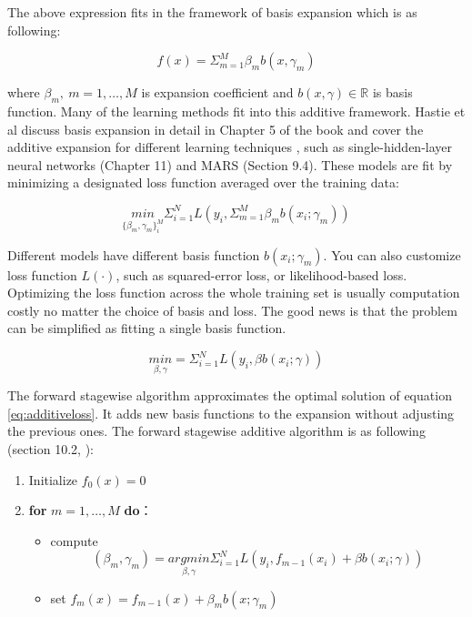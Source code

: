 \documentclass[12pt,]{krantz}
\providecommand{\tightlist}{%
  \setlength{\itemsep}{0pt}\setlength{\parskip}{0pt}}
\begin{document}
The above expression fits in the framework of basis expansion which is as following:

\begin{equation}
f(x)=\Sigma_{m=1}^M \beta_m b(x,\gamma_m)
\label{eq:basisexp}
\end{equation}

where \(\beta_m,\ m=1,\dots,M\) is expansion coefficient and \(b(x,\gamma)\in \mathbb{R}\) is basis function. Many of the learning methods fit into this additive framework. Hastie et al discuss basis expansion in detail in Chapter 5 of the book \citep{Hastie2008} and cover the additive expansion for different learning techniques \citep{Hastie2008}, such as single-hidden-layer neural networks (Chapter 11) and MARS (Section 9.4). These models are fit by minimizing a designated loss function averaged over the training data:

\begin{equation}
\underset{\{\beta_m,\gamma_m\}_i^M}{min}\Sigma_{i=1}^N L\left(y_i,\Sigma_{m=1}^M\beta_{m}b(x_i;\gamma_m)\right)
\label{eq:additiveloss}
\end{equation}

Different models have different basis function \(b(x_i;\gamma_m)\). You can also customize loss function \(L(\cdot)\), such as squared-error loss, or likelihood-based loss. Optimizing the loss function across the whole training set is usually computation costly no matter the choice of basis and loss. The good news is that the problem can be simplified as fitting a single basis function.

\[\underset{\beta,\gamma}{min}=\Sigma_{i=1}^N L(y_i,\beta b(x_i;\gamma))\]

The forward stagewise algorithm approximates the optimal solution of equation \eqref{eq:additiveloss}. It adds new basis functions to the expansion without adjusting the previous ones. The forward stagewise additive algorithm is as following (section 10.2, \citep{Hastie2008}):

\begin{enumerate}
\def\labelenumi{\arabic{enumi}.}
\tightlist
\item
  Initialize \(f_0(x)=0\)
\item
  \textbf{for} \(m=1,\dots,M\) \textbf{do}：

  \begin{itemize}
  \tightlist
  \item
    compute
    \[(\beta_m,\gamma_m)=\underset{\beta,\gamma}{argmin}\Sigma_{i=1}^NL(y_i,f_{m-1}(x_i)+\beta b(x_i;\gamma))\]
  \item
    set \(f_m(x)=f_{m-1}(x)+\beta_m b(x;\gamma_m)\)
  \end{itemize}
\end{enumerate}
\end{document}
